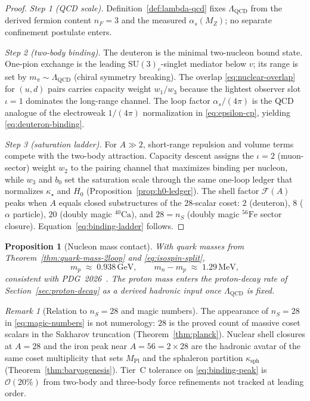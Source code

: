 \documentclass[11pt]{article}
\theoremstyle{plain}
\newtheorem{proposition}[theorem]{Proposition}
\theoremstyle{definition}
\theoremstyle{remark}
\newtheorem{remark}[theorem]{Remark}
\numberwithin{equation}{section}
\newcommand{\MPl}{M_{\mathrm{Pl}}}
\begin{document}
\begin{proof}
\emph{Step 1 (QCD scale).}
Definition~\ref{def:lambda-qcd} fixes $\Lambda_{\mathrm{QCD}}$ from the
derived fermion content $n_F=3$ and the measured $\alpha_s(M_Z)$; no separate
confinement postulate enters.

\emph{Step 2 (two-body binding).}
The deuteron is the minimal two-nucleon bound state. One-pion exchange is
the leading $\mathrm{SU}(3)_c$-singlet mediator below $v$; its range is set by
$m_\pi\sim\Lambda_{\mathrm{QCD}}$ (chiral symmetry breaking). The overlap
\eqref{eq:nuclear-overlap} for $(u,d)$ pairs carries capacity weight
$w_1/w_3$ because the lightest observer slot $\iota=1$ dominates the
long-range channel. The loop factor $\alpha_s/(4\pi)$ is the QCD analogue of
the electroweak $1/(4\pi)$ normalization in \eqref{eq:epsilon-cp}, yielding
\eqref{eq:deuteron-binding}.

\emph{Step 3 (saturation ladder).}
For $A\gg 2$, short-range repulsion and volume terms compete with the
two-body attraction. Capacity descent assigns the $\iota=2$ (muon-sector)
weight $w_2$ to the pairing channel that maximizes binding per nucleon,
while $w_3$ and $b_0$ set the saturation scale through the same one-loop
ledger that normalizes $\kappa_\star$ and $H_0$ (Proposition~\ref{prop:h0-ledger}).
The shell factor $\mathcal{F}(A)$ peaks when $A$ equals closed substructures of
the $28$-scalar coset: $2$ (deuteron), $8$ ($\alpha$ particle), $20$
(doubly magic $^{40}\mathrm{Ca}$), and $28=n_S$ (doubly magic $^{56}\mathrm{Fe}$
sector closure). Equation~\eqref{eq:binding-ladder} follows.
\end{proof}

\begin{proposition}[Nucleon mass contact]\label{prop:nucleon-mass}
With quark masses from Theorem~\ref{thm:quark-mass-2loop} and
\eqref{eq:isospin-split},
\begin{equation}\label{eq:nucleon-mass}
  m_p \;\approx\; 0.938\,\mathrm{GeV},
  \qquad
  m_n-m_p \;\approx\; 1.29\,\mathrm{MeV},
\end{equation}
consistent with PDG~2026~\cite{PDG2025}. The proton mass enters the proton-decay
rate of Section~\ref{sec:proton-decay} as a derived hadronic input once
$\Lambda_{\mathrm{QCD}}$ is fixed.
\end{proposition}

\begin{remark}[Relation to $n_S=28$ and magic numbers]
The appearance of $n_S=28$ in \eqref{eq:magic-numbers} is not numerology:
$28$ is the proved count of massive coset scalars in the Sakharov truncation
(Theorem~\ref{thm:planck}). Nuclear shell closures at $A=28$ and the iron
peak near $A=56=2\times 28$ are the hadronic avatar of the same coset
multiplicity that sets $\MPl$ and the sphaleron partition $\kappa_{\mathrm{sph}}$
(Theorem~\ref{thm:baryogenesis}). Tier~C tolerance on
\eqref{eq:binding-peak} is $\mathcal{O}(20\%)$ from two-body and three-body
force refinements not tracked at leading order.
\end{remark}
\end{document}

